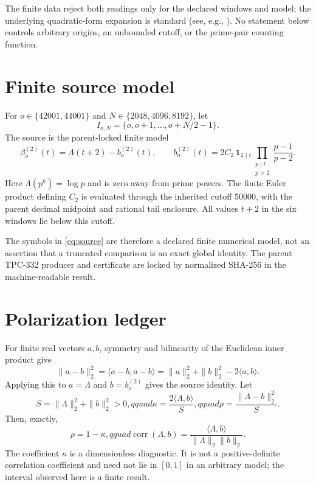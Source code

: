 \documentclass[10pt]{article}
\newcommand{\ind}{\mathbf 1}
\begin{document}
The finite data reject both readings only for the declared windows and model;
the underlying quadratic-form expansion is standard (see, e.g.,
\cite{horn2013matrix}).
No statement below controls arbitrary origins, an unbounded cutoff, or the
prime-pair counting function.

\section{Finite source model}

For $o\in\{42001,44001\}$ and $N\in\{2048,4096,8192\}$, let
\[
 I_{o,N}=\{o,o+1,\ldots,o+N/2-1\}.
\]
The source is the parent-locked finite model
\begin{equation}\label{eq:source}
 \beta_o^{(2)}(t)=\Lambda(t+2)-b_o^{(2)}(t),\qquad
 b_o^{(2)}(t)=2C_2\,\ind_{2\nmid t}
 \prod_{\substack{p\mid t\\p>2}}\frac{p-1}{p-2}.
\end{equation}
Here $\Lambda(p^k)=\log p$ and is zero away from prime powers.  The finite
Euler product defining $C_2$ is evaluated through the inherited cutoff
$50000$, with the parent decimal midpoint and rational tail enclosure.  All
values $t+2$ in the six windows lie below this cutoff.

The symbols in \eqref{eq:source} are therefore a declared finite numerical
model, not an assertion that a truncated comparison is an exact global
identity.  The parent TPC-332 producer and certificate are locked by
normalized SHA-256 in the machine-readable result.

\section{Polarization ledger}

For finite real vectors $a,b$, symmetry and bilinearity of the Euclidean
inner product give
\begin{equation}\label{eq:polarization}
 \|a-b\|_2^2=\langle a-b,a-b\rangle
 =\|a\|_2^2+\|b\|_2^2-2\langle a,b\rangle.
\end{equation}
Applying this to $a=\Lambda$ and $b=b_o^{(2)}$ gives the source identity.  Let
\[
 S=\|\Lambda\|_2^2+\|b\|_2^2>0,qquad
 \kappa=\frac{2\langle\Lambda,b\rangle}{S},qquad
 \rho=\frac{\|\Lambda-b\|_2^2}{S}.
\]
Then, exactly,
\begin{equation}\label{eq:complement}
 \rho=1-\kappa,qquad
 \operatorname{corr}(\Lambda,b)=
 \frac{\langle\Lambda,b\rangle}{\|\Lambda\|_2\|b\|_2}.
\end{equation}
The coefficient $\kappa$ is a dimensionless diagnostic.  It is not a
positive-definite correlation coefficient and need not lie in $[0,1]$ in an
arbitrary model; the interval observed here is a finite result.
\end{document}
